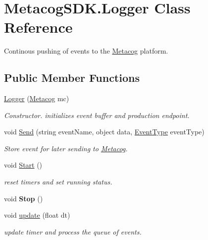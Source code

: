 \hypertarget{classMetacogSDK_1_1Logger}{}\section{Metacog\+S\+D\+K.\+Logger Class Reference}
\label{classMetacogSDK_1_1Logger}


Continous pushing of events to the \hyperlink{classMetacogSDK_1_1Metacog}{Metacog} platform.  


\subsection*{Public Member Functions}
\begin{DoxyCompactItemize}
\item 
\hyperlink{classMetacogSDK_1_1Logger_a3e137315344b8a7469d863bfd3495c2c}{Logger} (\hyperlink{classMetacogSDK_1_1Metacog}{Metacog} mc)
\begin{DoxyCompactList}\small\item\em Constructor. initializes event buffer and production endpoint. \end{DoxyCompactList}\item 
void \hyperlink{classMetacogSDK_1_1Logger_aa3b730166a419e25aa9a5c22a0d68690}{Send} (string event\+Name, object data, \hyperlink{namespaceMetacogSDK_a9a46be6b2e98a6ae7460c93faf69728e}{Event\+Type} event\+Type)
\begin{DoxyCompactList}\small\item\em Store event for later sending to \hyperlink{classMetacogSDK_1_1Metacog}{Metacog}. \end{DoxyCompactList}\item 
void \hyperlink{classMetacogSDK_1_1Logger_a5394b2435a693ba6b7b7745bb6d93129}{Start} ()
\begin{DoxyCompactList}\small\item\em reset timers and set running status. \end{DoxyCompactList}\item 
void {\bfseries Stop} ()\hypertarget{classMetacogSDK_1_1Logger_a4539588c58009fd4343a83757cf5b84f}{}\label{classMetacogSDK_1_1Logger_a4539588c58009fd4343a83757cf5b84f}

\item 
void \hyperlink{classMetacogSDK_1_1Logger_a42cbf5df7e9d83ee96010c63eb62d66a}{update} (float dt)
\begin{DoxyCompactList}\small\item\em update timer and process the queue of events. \end{DoxyCompactList}\end{DoxyCompactItemize}



